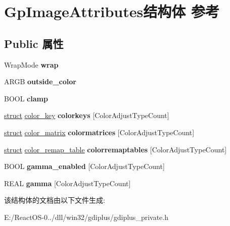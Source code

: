 \hypertarget{struct_gp_image_attributes}{}\section{Gp\+Image\+Attributes结构体 参考}
\label{struct_gp_image_attributes}
\subsection*{Public 属性}
\begin{DoxyCompactItemize}
\item 
\mbox{\label{struct_gp_image_attributes_af7280a5e6d8a082f7469e57d09f815a4}} 
Wrap\+Mode {\bfseries wrap}
\item 
\mbox{\label{struct_gp_image_attributes_aa2332faaf2bc38e92c8a8ad01754de8c}} 
A\+R\+GB {\bfseries outside\+\_\+color}
\item 
\mbox{\label{struct_gp_image_attributes_adda1a870d529e2ee241304ecec404f63}} 
B\+O\+OL {\bfseries clamp}
\item 
\mbox{\label{struct_gp_image_attributes_a0bb3cf6bae3bc36d957140f553fbb8c4}} 
\hyperlink{interfacestruct}{struct} \hyperlink{structcolor__key}{color\+\_\+key} {\bfseries colorkeys} \mbox{[}Color\+Adjust\+Type\+Count\mbox{]}
\item 
\mbox{\label{struct_gp_image_attributes_a7b684df481498862932f437793c36009}} 
\hyperlink{interfacestruct}{struct} \hyperlink{structcolor__matrix}{color\+\_\+matrix} {\bfseries colormatrices} \mbox{[}Color\+Adjust\+Type\+Count\mbox{]}
\item 
\mbox{\label{struct_gp_image_attributes_a9ec93467299010d033752aef4947e5e7}} 
\hyperlink{interfacestruct}{struct} \hyperlink{structcolor__remap__table}{color\+\_\+remap\+\_\+table} {\bfseries colorremaptables} \mbox{[}Color\+Adjust\+Type\+Count\mbox{]}
\item 
\mbox{\label{struct_gp_image_attributes_a9cf8666c4e237f924fb68c27ed7db8b9}} 
B\+O\+OL {\bfseries gamma\+\_\+enabled} \mbox{[}Color\+Adjust\+Type\+Count\mbox{]}
\item 
\mbox{\label{struct_gp_image_attributes_a1a800ebbd6c7661cf1902b9517c2defb}} 
R\+E\+AL {\bfseries gamma} \mbox{[}Color\+Adjust\+Type\+Count\mbox{]}
\end{DoxyCompactItemize}


该结构体的文档由以下文件生成\+:\begin{DoxyCompactItemize}
\item 
E\+:/\+React\+O\+S-\/0../dll/win32/gdiplus/gdiplus\+\_\+private.\+h\end{DoxyCompactItemize}
